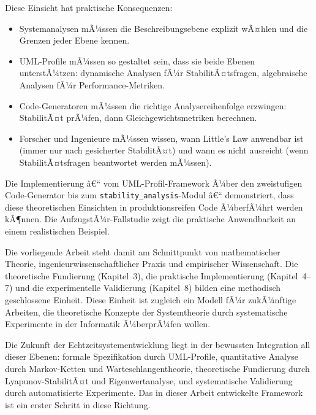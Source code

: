﻿\documentclass[a4paper,12pt]{report}
\theoremstyle{definition}
\begin{document}
Diese Einsicht hat praktische Konsequenzen:
\begin{itemize}
	\item[-] Systemanalysen mÃ¼ssen die Beschreibungsebene explizit wÃ¤hlen
	und die Grenzen jeder Ebene kennen.
	\item[-] UML-Profile mÃ¼ssen so gestaltet sein, dass sie beide Ebenen
	unterstÃ¼tzen: dynamische Analysen fÃ¼r StabilitÃ¤tsfragen,
	algebraische Analysen fÃ¼r Performance-Metriken.
	\item[-] Code-Generatoren mÃ¼ssen die richtige Analysereihenfolge
	erzwingen: StabilitÃ¤t prÃ¼fen, dann Gleichgewichtsmetriken
	berechnen.
	\item[-] Forscher und Ingenieure mÃ¼ssen wissen, wann Little's Law
	anwendbar ist (immer nur nach gesicherter StabilitÃ¤t) und
	wann es nicht ausreicht (wenn StabilitÃ¤tsfragen beantwortet
	werden mÃ¼ssen).
\end{itemize}

Die Implementierung â€“ vom UML-Profil-Framework Ã¼ber den zweistufigen
Code-Generator bis zum \texttt{stability\_analysis}-Modul â€“ demonstriert,
dass diese theoretischen Einsichten in produktionsreifen Code Ã¼berfÃ¼hrt
werden kÃ¶nnen.  Die AufzugstÃ¼r-Fallstudie zeigt die praktische
Anwendbarkeit an einem realistischen Beispiel.

Die vorliegende Arbeit steht damit am Schnittpunkt von mathematischer Theorie,
ingenieurwissenschaftlicher Praxis und empirischer Wissenschaft.  Die
theoretische Fundierung (Kapitel~3), die praktische Implementierung
(Kapitel~4--7) und die experimentelle Validierung (Kapitel~8) bilden eine
methodisch geschlossene Einheit.  Diese Einheit ist zugleich ein Modell
fÃ¼r zukÃ¼nftige Arbeiten, die theoretische Konzepte der Systemtheorie durch
systematische Experimente in der Informatik Ã¼berprÃ¼fen wollen.

Die Zukunft der Echtzeitsystementwicklung liegt in der bewussten Integration
all dieser Ebenen: formale Spezifikation durch UML-Profile, quantitative
Analyse durch Markov-Ketten und Warteschlangentheorie, theoretische Fundierung
durch Lyapunov-StabilitÃ¤t und Eigenwertanalyse, und systematische Validierung
durch automatisierte Experimente.  Das in dieser Arbeit entwickelte Framework
ist ein erster Schritt in diese Richtung.

\end{document}
